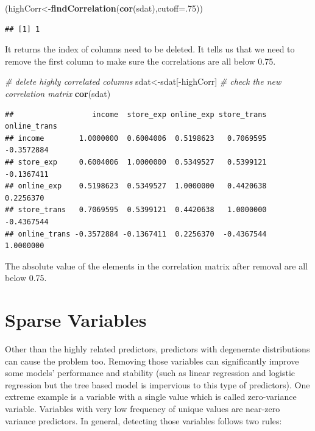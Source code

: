 \documentclass[]{book}
\newenvironment{Shaded}{\begin{snugshade}}{\end{snugshade}}
\newcommand{\KeywordTok}[1]{\textcolor[rgb]{0.13,0.29,0.53}{\textbf{{#1}}}}
\newcommand{\DataTypeTok}[1]{\textcolor[rgb]{0.13,0.29,0.53}{{#1}}}
\newcommand{\DecValTok}[1]{\textcolor[rgb]{0.00,0.00,0.81}{{#1}}}
\newcommand{\CommentTok}[1]{\textcolor[rgb]{0.56,0.35,0.01}{\textit{{#1}}}}
\newcommand{\NormalTok}[1]{{#1}}
\theoremstyle{definition}
\theoremstyle{definition}
\theoremstyle{remark}
\begin{document}
\begin{Shaded}
\begin{Highlighting}[]
\NormalTok{(highCorr<-}\KeywordTok{findCorrelation}\NormalTok{(}\KeywordTok{cor}\NormalTok{(sdat),}\DataTypeTok{cutoff=}\NormalTok{.}\DecValTok{75}\NormalTok{))}
\end{Highlighting}
\end{Shaded}

\begin{verbatim}
## [1] 1
\end{verbatim}

It returns the index of columns need to be deleted. It tells us that we
need to remove the first column to make sure the correlations are all
below 0.75.

\begin{Shaded}
\begin{Highlighting}[]
\CommentTok{# delete highly correlated columns}
\NormalTok{sdat<-sdat[-highCorr]}
\CommentTok{# check the new correlation matrix}
\KeywordTok{cor}\NormalTok{(sdat)}
\end{Highlighting}
\end{Shaded}

\begin{verbatim}
##                  income  store_exp online_exp store_trans online_trans
## income        1.0000000  0.6004006  0.5198623   0.7069595   -0.3572884
## store_exp     0.6004006  1.0000000  0.5349527   0.5399121   -0.1367411
## online_exp    0.5198623  0.5349527  1.0000000   0.4420638    0.2256370
## store_trans   0.7069595  0.5399121  0.4420638   1.0000000   -0.4367544
## online_trans -0.3572884 -0.1367411  0.2256370  -0.4367544    1.0000000
\end{verbatim}

The absolute value of the elements in the correlation matrix after
removal are all below 0.75.

\section{Sparse Variables}\label{sparse-variables}

Other than the highly related predictors, predictors with degenerate
distributions can cause the problem too. Removing those variables can
significantly improve some models' performance and stability (such as
linear regression and logistic regression but the tree based model is
impervious to this type of predictors). One extreme example is a
variable with a single value which is called zero-variance variable.
Variables with very low frequency of unique values are near-zero
variance predictors. In general, detecting those variables follows two
rules:
\end{document}
